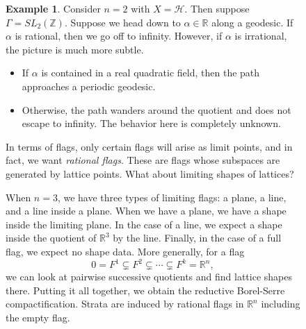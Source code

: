 \documentclass[leqno, openany]{memoir}
\theoremstyle{definition}
\newtheorem{exm}[thm]{Example}
\theoremstyle{remark}
\theoremstyle{plain}
\theoremstyle{definition}
\theoremstyle{remark}
\newcommand{\R}{\mathbb{R}}
\newcommand{\Z}{\mathbb{Z}}
\newcommand{\mc}[1]{\mathcal{#1}}
\begin{document}
\begin{figure}[H]
\begin{exm} Consider $n=2$ with $X = \mc{H}$. Then suppose $\Gamma = SL_2(\Z)$.
    Suppose we head down to $\alpha \in \R$ along a geodesic. If $\alpha$ is
    rational, then we go off to infinity. However, if $\alpha$ is irrational,
    the picture is much more subtle.  \begin{itemize} \item If $\alpha$ is
        contained in a real quadratic field, then the path approaches a
        periodic geodesic.  \item Otherwise, the path wanders around the
        quotient and does not escape to infinity. The behavior here is
        completely unknown.  \end{itemize} \end{exm}

In terms of flags, only certain flags will arise as limit points, and in fact,
we want \textit{rational flags}. These are flags whose subspaces are generated
by lattice points. What about limiting shapes of lattices?

When $n=3$, we have three types of limiting flags: a plane, a line, and a line
inside a plane. When we have a plane, we have a shape inside the limiting
plane. In the case of a line, we expect a shape inside the quotient of $\R^3$
by the line. Finally, in the case of a full flag, we expect no shape data. More
generally, for a flag \[ 0 = F^1 \subsetneq F^2 \subsetneq \cdots \subsetneq
F^k = \R^n, \] we can look at pairwise successive quotients and find lattice
shapes there. Putting it all together, we obtain the reductive Borel-Serre
compactification. Strata are induced by rational flags in $\R^n$ including the
empty flag.


\end{figure}
\end{document}
